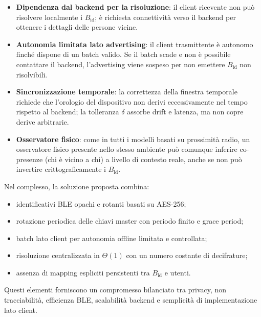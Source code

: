 \documentclass[a4paper,11pt]{article}
\begin{document}
\begin{itemize}
  \item \textbf{Dipendenza dal backend per la risoluzione}: il client ricevente non può risolvere
        localmente i \(B_{\text{id}}\); è richiesta connettività verso il backend per ottenere i
        dettagli delle persone vicine.
  \item \textbf{Autonomia limitata lato advertising}: il client trasmittente è autonomo finché
        dispone di un batch valido. Se il batch scade e non è possibile contattare il backend,
        l’advertising viene sospeso per non emettere \(B_{\text{id}}\) non risolvibili.
  \item \textbf{Sincronizzazione temporale}: la correttezza della finestra temporale richiede che
        l’orologio del dispositivo non derivi eccessivamente nel tempo rispetto al backend; la
        tolleranza \(\delta\) assorbe drift e latenza, ma non copre derive arbitrarie.
  \item \textbf{Osservatore fisico}: come in tutti i modelli basati su prossimità radio, un
        osservatore fisico presente nello stesso ambiente può comunque inferire co-presenze
        (chi è vicino a chi) a livello di contesto reale, anche se non può invertire
        crittograficamente i \(B_{\text{id}}\).
\end{itemize}

Nel complesso, la soluzione proposta combina:

\begin{itemize}
  \item identificativi BLE opachi e rotanti basati su AES-256;
  \item rotazione periodica delle chiavi master con periodo finito e grace period;
  \item batch lato client per autonomia offline limitata e controllata;
  \item risoluzione centralizzata in \(\Theta(1)\) con un numero costante di decifrature;
  \item assenza di mapping espliciti persistenti tra \(B_{\text{id}}\) e utenti.
\end{itemize}

Questi elementi forniscono un compromesso bilanciato tra privacy, non tracciabilità, efficienza
BLE, scalabilità backend e semplicità di implementazione lato client.
\end{document}
